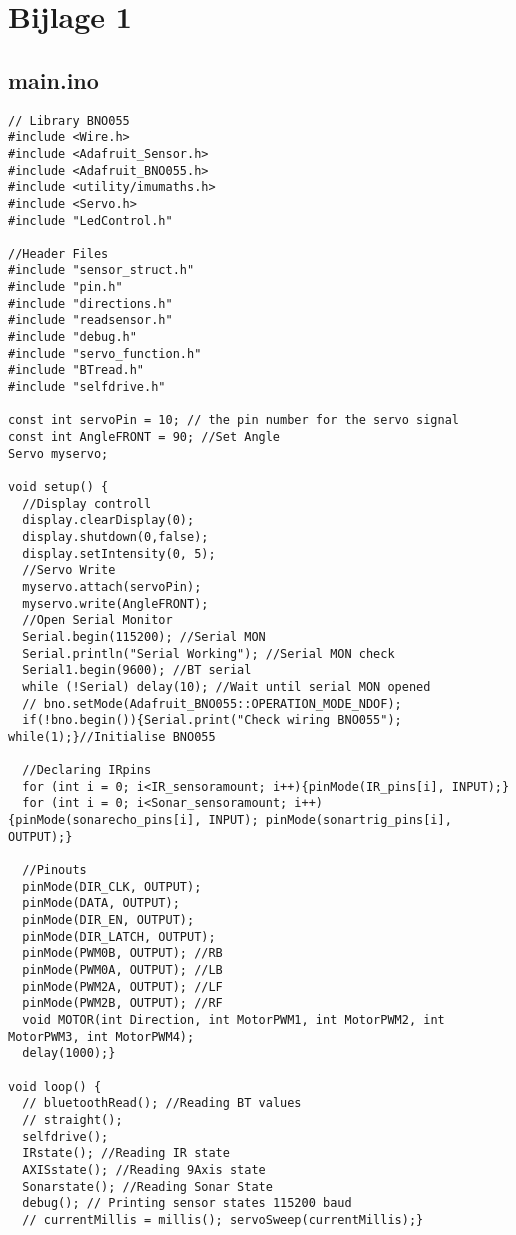 \section{Bijlage 1}
\subsection{main.ino}
\begin{lstlisting}
// Library BNO055
#include <Wire.h>
#include <Adafruit_Sensor.h>
#include <Adafruit_BNO055.h>
#include <utility/imumaths.h>
#include <Servo.h>
#include "LedControl.h"

//Header Files
#include "sensor_struct.h"	
#include "pin.h"
#include "directions.h"
#include "readsensor.h"
#include "debug.h"
#include "servo_function.h"
#include "BTread.h"
#include "selfdrive.h"

const int servoPin = 10; // the pin number for the servo signal
const int AngleFRONT = 90; //Set Angle
Servo myservo;

void setup() {
  //Display controll 
  display.clearDisplay(0);
  display.shutdown(0,false);
  display.setIntensity(0, 5); 
  //Servo Write
  myservo.attach(servoPin);
  myservo.write(AngleFRONT);
  //Open Serial Monitor
  Serial.begin(115200); //Serial MON
  Serial.println("Serial Working"); //Serial MON check
  Serial1.begin(9600); //BT serial
  while (!Serial) delay(10); //Wait until serial MON opened
  // bno.setMode(Adafruit_BNO055::OPERATION_MODE_NDOF);
  if(!bno.begin()){Serial.print("Check wiring BNO055"); while(1);}//Initialise BNO055
  
  //Declaring IRpins
  for (int i = 0; i<IR_sensoramount; i++){pinMode(IR_pins[i], INPUT);}
  for (int i = 0; i<Sonar_sensoramount; i++){pinMode(sonarecho_pins[i], INPUT); pinMode(sonartrig_pins[i], OUTPUT);}

  //Pinouts
  pinMode(DIR_CLK, OUTPUT);
  pinMode(DATA, OUTPUT);
  pinMode(DIR_EN, OUTPUT);
  pinMode(DIR_LATCH, OUTPUT);
  pinMode(PWM0B, OUTPUT); //RB
  pinMode(PWM0A, OUTPUT); //LB
  pinMode(PWM2A, OUTPUT); //LF
  pinMode(PWM2B, OUTPUT); //RF 
  void MOTOR(int Direction, int MotorPWM1, int MotorPWM2, int MotorPWM3, int MotorPWM4);
  delay(1000);}

void loop() {
  // bluetoothRead(); //Reading BT values
  // straight();
  selfdrive();
  IRstate(); //Reading IR state
  AXISstate(); //Reading 9Axis state
  Sonarstate(); //Reading Sonar State
  debug(); // Printing sensor states 115200 baud
  // currentMillis = millis(); servoSweep(currentMillis);}
\end{lstlisting}

